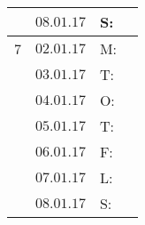 \documentclass{article}
\begin{document}
\begin{center}
\begin{tabular}{|c|l|l|l|}
          & $08.01.17$       & S:    &              \\
\hline                                                         
7	      & $02.01.17$       & M:    &              \\\rowcolor{gainsboro}
          & $03.01.17$       & T:    &              \\
          & $04.01.17$       & O:    &              \\\rowcolor{gainsboro}
          & $05.01.17$       & T:    &              \\
          & $06.01.17$       & F:    &              \\\rowcolor{gainsboro}
          & $07.01.17$       & L:    &              \\    
          & $08.01.17$       & S:    &              \\
\hline
\end{tabular}                                                                   
\end{center}
\end{document}
